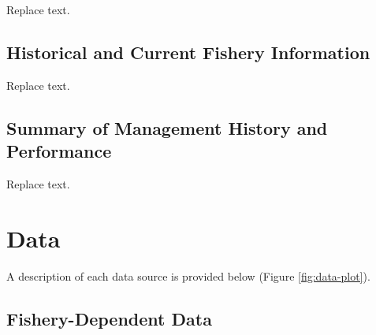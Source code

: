 \documentclass[11pt,
  english,
  a4paper,
]{article}
\begin{document}
Replace text.

\leavevmode\tagmcend\tagstructend\par


\hypertarget{historical-and-current-fishery-information}{%
\subsection{Historical and Current Fishery Information}\label{historical-and-current-fishery-information}}

\leavevmode\tagmcend\tagstructend


Replace text.

\leavevmode\tagmcend\tagstructend\par


\hypertarget{summary-of-management-history-and-performance}{%
\subsection{Summary of Management History and Performance}\label{summary-of-management-history-and-performance}}

\leavevmode\tagmcend\tagstructend


Replace text.

\leavevmode\tagmcend\tagstructend\par


\hypertarget{data}{%
\section{Data}\label{data}}

\leavevmode\tagmcend\tagstructend


A description of each data source is provided below (Figure \ref{fig:data-plot}).

\leavevmode\tagmcend\tagstructend\par


\hypertarget{fishery-dependent-data}{%
\subsection{Fishery-Dependent Data}\label{fishery-dependent-data}}
\end{document}
